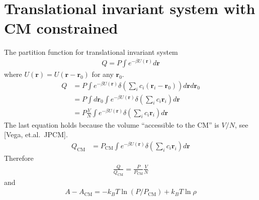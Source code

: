 \documentclass[aps,pre,a4paper,showkeys,fleqn]{revtex4}
\newcommand{\com}[0]{{\textrm{CM}}}
\begin{document}
\section{Translational invariant system with CM constrained}
The partition function for translational invariant system
\begin{align*}
  Q = P \int e^{-\beta U(\bm r)}d \bm r
\end{align*}
where $U(\bm r) = U(\bm r - \bm r_0)$ for any $\bm r_0$.
\begin{align*}
  Q
  &=
    P \int e^{-\beta U(\bm r)} \delta(\sum_i c_i (\bm r_i - \bm r_0)) d\bm r d\bm r_0 \\
  &=
    P\int d\bm r_0 \int e^{-\beta U(\bm r)} \delta(\sum_i c_i \bm r_i) d\bm r\\
  &=
    P\frac{V}{N} \int e^{-\beta U(\bm r)} \delta(\sum_i c_i \bm r_i) d\bm r
\end{align*}
The last equation holds because the volume ``accessible to the CM'' is $V/N$, see [Vega, et.al.~JPCM].
\begin{align*}
  Q_\com
  &=
    P_\com\int e^{-\beta U(\bm r)} \delta(\sum_i c_i \bm r_i) d\bm r
\end{align*}
Therefore
\begin{align*}
  \frac{Q}{Q_\com} = \frac{P}{P_\com}\frac{V}{N}
\end{align*}
and
\begin{align}
  A - A_\com = -k_BT\ln(P / P_\com) + k_BT\ln \rho
\end{align}
\end{document}
